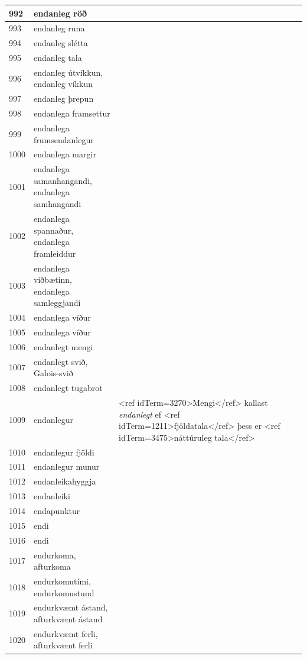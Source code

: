 \begin{longtable}{p{}|p{}|p{}|p{}|p{}}
\hline
992 & endanleg röð &  &  &  \\
\hline
993 & endanleg runa &  &  &  \\
\hline
994 & endanleg slétta &  &  &  \\
\hline
995 & endanleg tala &  &  &  \\
\hline
996 & endanleg útvíkkun, endanleg víkkun &  &  &  \\
\hline
997 & endanleg þrepun &  &  &  \\
\hline
998 & endanlega framsettur &  &  &  \\
\hline
999 & endanlega frumsendanlegur &  &  &  \\
\hline
1000 & endanlega margir &  &  &  \\
\hline
1001 & endanlega samanhangandi, endanlega samhangandi &  &  &  \\
\hline
1002 & endanlega spannaður, endanlega framleiddur &  &  &  \\
\hline
1003 & endanlega viðbætinn, endanlega samleggjandi &  &  &  \\
\hline
1004 & endanlega víður &  &  &  \\
\hline
1005 & endanlega víður &  &  &  \\
\hline
1006 & endanlegt mengi &  &  &  \\
\hline
1007 & endanlegt svið, Galois-svið &  &  &  \\
\hline
1008 & endanlegt tugabrot &  &  &  \\
\hline
1009 & endanlegur & <ref idTerm=3270>Mengi</ref> kallast \textit{endanlegt} ef <ref idTerm=1211>fjöldatala</ref> þess er <ref idTerm=3475>náttúruleg tala</ref> &  &  \\
\hline
1010 & endanlegur fjöldi &  &  &  \\
\hline
1011 & endanlegur munur &  &  &  \\
\hline
1012 & endanleikahyggja &  &  &  \\
\hline
1013 & endanleiki &  &  &  \\
\hline
1014 & endapunktur &  &  &  \\
\hline
1015 & endi &  &  &  \\
\hline
1016 & endi &  &  &  \\
\hline
1017 & endurkoma, afturkoma &  &  &  \\
\hline
1018 & endurkomutími, endurkomustund &  &  &  \\
\hline
1019 & endurkvæmt ástand, afturkvæmt ástand &  &  &  \\
\hline
1020 & endurkvæmt ferli, afturkvæmt ferli &  &  &  \\

\end{longtable}

